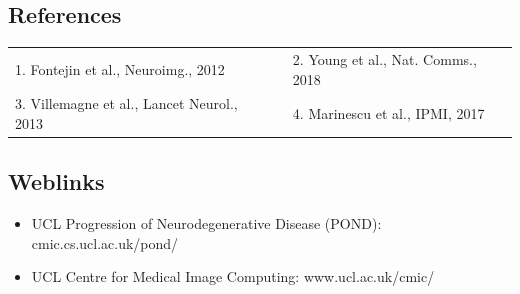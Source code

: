 \documentclass[portrait,a0,final,19pt]{a0poster}
\begin{document}
\begin{multicols}{2}
\raggedcolumns	

\subsection*{References}

\large{
\begin{tabular}{l p{0.5cm} l}
 1. Fontejin et al., Neuroimg., 2012 & & 2. Young et al., Nat. Comms., 2018\\
 3. Villemagne et al., Lancet Neurol., 2013 & & 4. Marinescu et al., IPMI, 2017\\
\end{tabular}

\columnbreak

\subsection*{Weblinks}
\begin{itemize}
\item UCL Progression of Neurodegenerative Disease (POND): cmic.cs.ucl.ac.uk/pond/
\item UCL Centre for Medical Image Computing: www.ucl.ac.uk/cmic/
\end{itemize}
}



\end{multicols}
\end{document}
